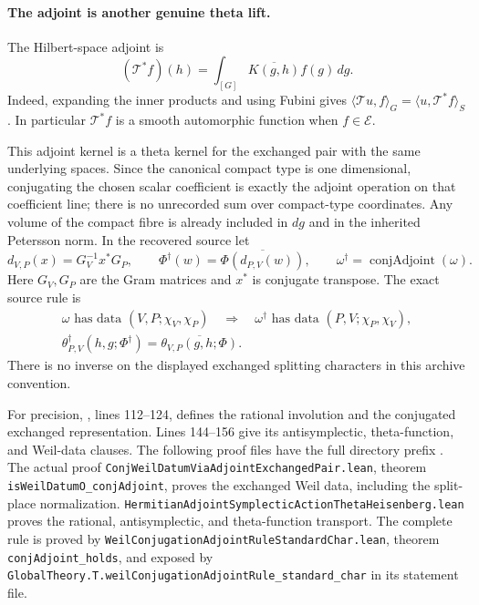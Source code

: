 \documentclass[11pt]{article}
\theoremstyle{definition}\newtheorem{definition}[theorem]{Definition}\newtheorem{remark}[theorem]{Remark}
\begin{document}
\paragraph{The adjoint is another genuine theta lift.}
The Hilbert-space adjoint is
\[
 (\mathcal T^*f)(h)
   =\int_{[G]}\overline{K(g,h)}f(g)\,dg.
 \tag{B17b}
\]
Indeed, expanding the inner products and using Fubini gives
$\langle\mathcal T u,f\rangle_G
 =\langle u,\mathcal T^*f\rangle_S$.
In particular $\mathcal T^*f$ is a smooth automorphic function
when $f\in\mathcal E$.

This adjoint kernel is a theta kernel for the exchanged pair with
the same underlying spaces. Since the canonical compact type is
one dimensional, conjugating the chosen scalar coefficient is
exactly the adjoint operation on that coefficient line; there is
no unrecorded sum over compact-type coordinates. Any volume of
the compact fibre is already included in $dg$ and in the
inherited Petersson norm. In the recovered source let
\[
 d_{V,P}(x)=G_V^{-1}x^*G_P,\qquad
 \Phi^\dagger(w)=\overline{\Phi(d_{P,V}(w))},
 \qquad \omega^\dagger=\operatorname{conjAdjoint}(\omega).
\]
Here $G_V,G_P$ are the Gram matrices and $x^*$ is conjugate
transpose. The exact source rule is
\begin{equation}
\begin{gathered}
 \omega\text{ has data }(V,P;\chi_V,\chi_P)
 \quad\Longrightarrow\quad
 \omega^\dagger\text{ has data }(P,V;\chi_P,\chi_V),\\
 \theta_{P,V}^{\dagger}(h,g;\Phi^\dagger)
       =\overline{\theta_{V,P}(g,h;\Phi)}.
\end{gathered}
\tag{B17c}
\end{equation}
There is no inverse on the displayed exchanged splitting
characters in this archive convention.

For precision,
, lines
112--124, defines the rational involution and the conjugated
exchanged representation. Lines 144--156 give its
antisymplectic, theta-function, and Weil-data clauses.
The following proof files have the full directory prefix
.
The actual proof \nolinkurl{ConjWeilDatumViaAdjointExchangedPair.lean},
theorem \nolinkurl{isWeilDatumO_conjAdjoint}, proves the exchanged
Weil data, including the split-place normalization.
\nolinkurl{HermitianAdjointSymplecticActionThetaHeisenberg.lean}
proves the rational, antisymplectic, and theta-function
transport. The complete rule is proved by
\nolinkurl{WeilConjugationAdjointRuleStandardChar.lean},
theorem \texttt{conjAdjoint\_holds}, and exposed by
\nolinkurl{GlobalTheory.T.weilConjugationAdjointRule_standard_char}
in its statement file.
\end{document}
